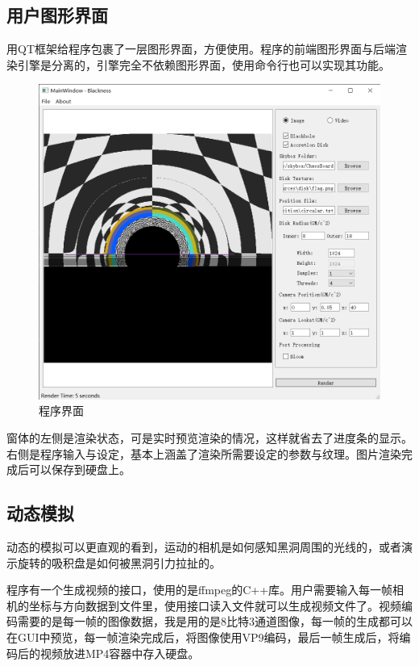 \subsection{用户图形界面}
用QT框架给程序包裹了一层图形界面，方便使用。程序的前端图形界面与后端渲染引擎是分离的，引擎完全不依赖图形界面，使用命令行也可以实现其功能。
\begin{figure}[H]
    \centering
    \includegraphics[scale=0.5]{images/gui.png}
    \caption{程序界面}
    \label{fig:gui} %
\end{figure}
窗体的左侧是渲染状态，可是实时预览渲染的情况，这样就省去了进度条的显示。右侧是程序输入与设定，基本上涵盖了渲染所需要设定的参数与纹理。图片渲染完成后可以保存到硬盘上。

\subsection{动态模拟}
动态的模拟可以更直观的看到，运动的相机是如何感知黑洞周围的光线的，或者演示旋转的吸积盘是如何被黑洞引力拉扯的。

程序有一个生成视频的接口，使用的是ffmpeg的C++库。用户需要输入每一帧相机的坐标与方向数据到文件里，使用接口读入文件就可以生成视频文件了。视频编码需要的是每一帧的图像数据，我是用的是8比特3通道图像，每一帧的生成都可以在GUI中预览，每一帧渲染完成后，将图像使用VP9编码，最后一帧生成后，将编码后的视频放进MP4容器中存入硬盘。

